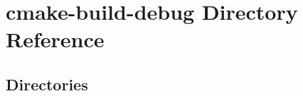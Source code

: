 \section{cmake-\/build-\/debug Directory Reference}
\label{dir_95e29a8b8ee7c54052c171a88bb95675}
\subsection*{Directories}
\begin{DoxyCompactItemize}
\end{DoxyCompactItemize}
